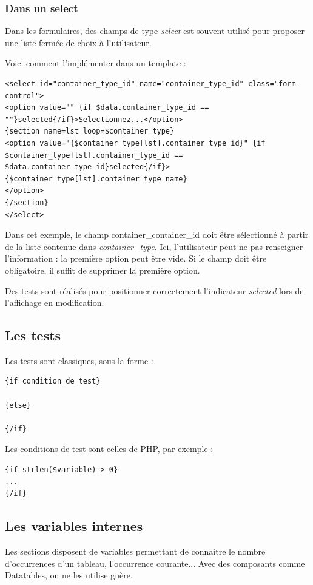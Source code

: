 \subsubsection{Dans un select}

Dans les formulaires, des champs de type \textit{select} est souvent utilisé pour proposer une liste fermée de choix à l'utilisateur. 

Voici comment l'implémenter dans un template :

\begin{lstlisting}
<select id="container_type_id" name="container_type_id" class="form-control">
<option value="" {if $data.container_type_id == ""}selected{/if}>Selectionnez...</option>
{section name=lst loop=$container_type}
<option value="{$container_type[lst].container_type_id}" {if $container_type[lst].container_type_id == $data.container_type_id}selected{/if}>
{$container_type[lst].container_type_name}
</option>
{/section}
</select>
\end{lstlisting}

Dans cet exemple, le champ container\_container\_id doit être sélectionné à partir de la liste contenue dans \textit{container\_type}. Ici, l'utilisateur peut ne pas renseigner l'information : la première option peut être vide. Si le champ doit être obligatoire, il suffit de supprimer la première option.

Des tests sont réalisés pour positionner correctement l'indicateur \textit{selected} lors de l'affichage en modification.

\subsection{Les tests}

Les tests sont classiques, sous la forme : 
\begin{lstlisting}
{if condition_de_test}

{else}

{/if}
\end{lstlisting}

Les conditions de test sont celles de PHP, par exemple :
\begin{lstlisting}
{if strlen($variable) > 0}
...
{/if}
\end{lstlisting}

\subsection{Les variables internes}
Les sections disposent de variables permettant de connaître le nombre d'occurrences d'un tableau, l'occurrence courante... Avec des composants comme Datatables, on ne les utilise guère.

